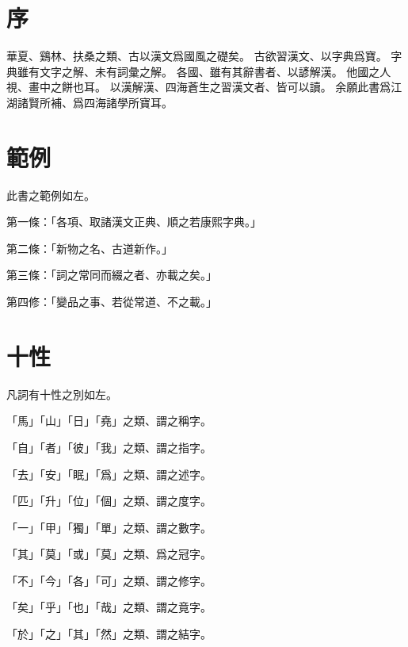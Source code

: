 \section{序}
華夏、鷄林、扶桑之類、古以漢文爲國風之礎矣。
古欲習漢文、以字典爲寶。
字典雖有文字之解、未有詞彙之解。
各國、雖有其辭書者、以諺解漢。
他國之人視、畫中之餅也耳。
以漢解漢、四海蒼生之習漢文者、皆可以讀。
余願此書爲江湖諸賢所補、爲四海諸學所寶耳。
\section{範例}
此書之範例如左。
\par 第一條：「各項、取諸漢文正典、順之若康熙字典。」
\par 第二條：「新物之名、古道新作。」
\par 第三條：「詞之常同而綴之者、亦載之矣。」
\par 第四修：「變品之事、若從常道、不之載。」
\section{十性}
\par 凡詞有十性之別如左。
\par 「馬」「山」「日」「堯」之類、謂之稱字。
\par 「自」「者」「彼」「我」之類、謂之指字。
\par 「去」「安」「眠」「爲」之類、謂之述字。
\par 「匹」「升」「位」「個」之類、謂之度字。
\par 「一」「甲」「獨」「單」之類、謂之數字。
\par 「其」「莫」「或」「莫」之類、爲之冠字。
\par 「不」「今」「各」「可」之類、謂之修字。
\par 「矣」「乎」「也」「哉」之類、謂之竟字。
\par 「於」「之」「其」「然」之類、謂之結字。
\section{}
